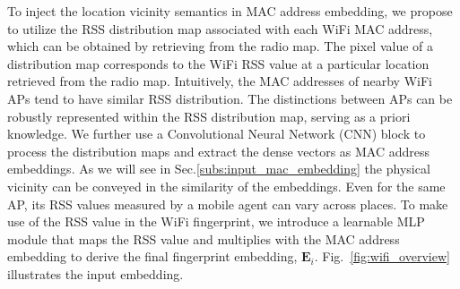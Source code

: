 To inject the location vicinity semantics in MAC address embedding, we propose to utilize the RSS distribution map associated with each WiFi MAC address, which can be obtained by retrieving from the radio map. The pixel value of a distribution map corresponds to the WiFi RSS value at a particular location retrieved from the radio map. 
Intuitively, the MAC addresses of nearby WiFi APs tend to have similar RSS distribution. 
The distinctions between APs can be robustly represented within the RSS distribution map, serving as a priori knowledge.
We further use a Convolutional Neural Network (CNN) block to process the distribution maps and extract the dense vectors as MAC address embeddings. 
As we will see in Sec.\ref{subs:input_mac_embedding} the physical vicinity can be conveyed in the similarity of the embeddings. Even for the same AP, its RSS values measured by a mobile agent can vary across places. To make use of the RSS value in the WiFi fingerprint, we introduce a learnable MLP module that maps the RSS value and multiplies with the MAC address embedding to derive the final fingerprint embedding, $\mathbf{E}_i$. Fig.~\ref{fig:wifi_overview} illustrates the input embedding. 

